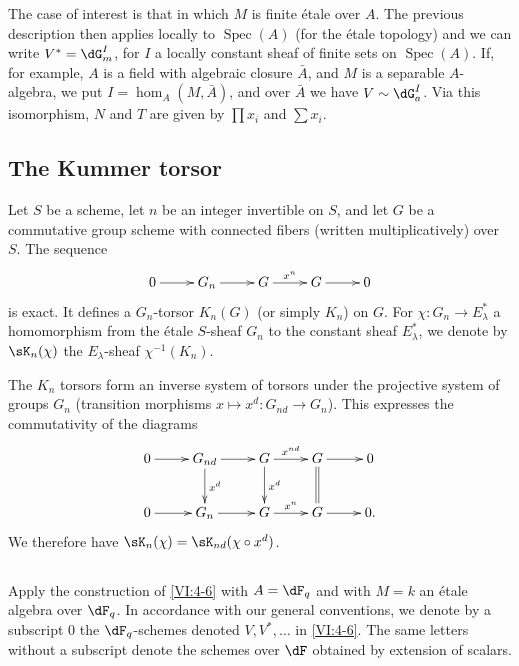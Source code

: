 \documentclass[oneside]{book}
\DeclareMathOperator{\spec}{Spec}
\theoremstyle{sga-source}
\theoremstyle{sga-source-dash}
\theoremstyle{sga-source-dotdash}
\theoremstyle{sga-source-number-note-dash}
\theoremstyle{sga-source-note-number-dotdash}
\theoremstyle{sga-source-example-dotdash}
\theoremstyle{sga-source-inline-number}
\theoremstyle{sga-source-bare-number}
\theoremstyle{sga-source}
\newcommand{\PrintPage}[1]{}\newcommand{\MathPage}[1]{}\newcommand{\PrintCite}[2]{#1}\newcommand{\var}[3]{#1}
\begin{document}
\PrintPage{199}
The case of interest is that in which $M$ is finite étale over $A$. The 
previous description then applies locally to $\spec(A)$ (for the 
étale topology) and we can write $V^\ast=\dG_m^I$, for $I$ a locally 
constant sheaf of finite sets on $\spec(A)$. If, for example, $A$ is a 
field with algebraic closure $\bar A$, and $M$ is a separable $A$-algebra, 
we put $I=\hom_A(M,\bar A)$, and over $\bar A$ we have 
$V\sim \dG_a^I$. Via this isomorphism, $N$ and $T$ are given by $\prod x_i$ and 
$\sum x_i$. 





\subsection{The Kummer torsor}\label{VI:4-7}

Let $S$ be a scheme, let $n$ be an integer invertible on $S$, and let $G$ be a 
commutative group scheme with connected fibers (written multiplicatively) over $S$. 
The sequence 
\[\xymatrix{
  0 \ar[r] 
    & G_n \ar[r] 
    & G \ar[r]^-{x^n} 
    & G \ar[r] 
    & 0 
}\]
is exact. It defines a $G_n$-torsor $K_n(G)$ (or simply $K_n$) on 
$G$. For $\chi:G_n \to E_\lambda^\ast$ a homomorphism from the étale 
$S$-sheaf $G_n$ to the constant sheaf $E_\lambda^\ast$, we denote by 
$\sK_n(\chi)$ the $E_\lambda$-sheaf $\chi^{-1}(K_n)$. 

The $K_n$ torsors form an inverse system of torsors under the 
projective system of groups $G_n$ (transition morphisms 
$x\mapsto x^d:G_{n d}\to G_n$). This expresses the commutativity of the diagrams 
\[\xymatrix{
  0 \ar[r] 
    & G_{n d} \ar[r] \ar[d]^-{x^d} 
    & G \ar[r]^-{x^{n d}} \ar[d]^-{x^d} 
    & G \ar[r] \ar@{=}[d] 
    & 0 \\
  0 \ar[r] 
    & G_n \ar[r] 
    & G \ar[r]^-{x^n} 
    & G \ar[r] 
    & 0 \text{.} 
}\]
We therefore have $\sK_n(\chi) = \sK_{n d}(\chi\circ x^d)$. 





\subsection{}\label{VI:4-8}

Apply the construction of \ref{VI:4-6} with $A=\dF_q$ and with $M=k$ an 
étale algebra over $\dF_q$. In accordance with our general conventions, we denote 
by a subscript $0$ the $\dF_q$-schemes denoted $V,V^\ast,\ldots$ in 
\ref{VI:4-6}. The same letters without a subscript denote the schemes over 
$\dF$ obtained by extension of scalars. 
\end{document}
